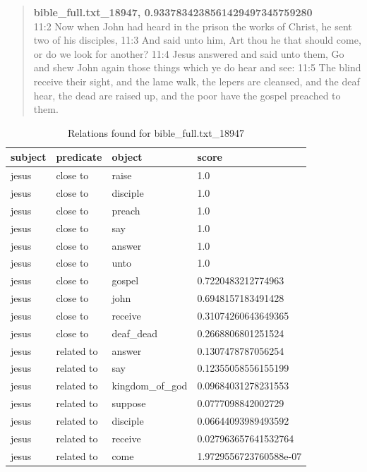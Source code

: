 \clearpage
\blockquote{\textbf{bible\_full.txt\_18947, 0.9337834238561429497345759280}\\
11:2 Now when John had heard in the prison the works of Christ, he sent two of his disciples, 11:3 And said unto him, Art thou he that should come, or do we look for another? 11:4 Jesus answered and said unto them, Go and shew John again those things which ye do hear and see: 11:5 The blind receive their sight, and the lame walk, the lepers are cleansed, and the deaf hear, the dead are raised up, and the poor have the gospel preached to them.}
\begin{table}[H]
\centering
    \begin{tabular}{|l|l|l|l|}
    \hline
    subject & predicate & object & score \\
    \hline
    jesus &close to & raise & 1.0\\
    jesus &close to& disciple & 1.0\\
    jesus &close to& preach & 1.0\\
    jesus &close to& say & 1.0\\
    jesus &close to& answer & 1.0\\
    jesus &close to& unto & 1.0\\
    jesus &close to& gospel & 0.7220483212774963\\
    jesus &close to& john & 0.6948157183491428\\
    jesus &close to& receive & 0.31074260643649365\\
    jesus &close to& deaf\_dead & 0.2668806801251524\\
    \hline
    jesus & related to & answer & 0.1307478787056254 \\
    jesus &related to & say & 0.12355058556155199 \\
    jesus &related to & kingdom\_of\_god & 0.09684031278231553 \\
    jesus &related to & suppose & 0.0777098842002729 \\
    jesus &related to & disciple & 0.06644093989493592 \\
    jesus &related to & receive & 0.027963657641532764 \\
    jesus &related to & come & 1.9729556723760588e-07 \\
    \hline
\end{tabular}
\caption{Relations found for bible\_full.txt\_18947}
\label{tab:relations_jesus_18947}
\end{table}

\clearpage
